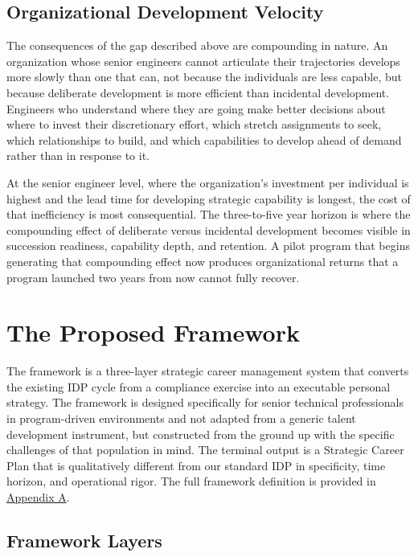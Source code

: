 \documentclass{article}
\begin{document}
\subsection{Organizational Development Velocity}

The consequences of the gap described above are compounding in nature.
An organization whose senior engineers cannot articulate their trajectories
develops more slowly than one that can, not because the individuals are less
capable, but because deliberate development is more efficient than incidental
development. Engineers who understand where they are going make better decisions
about where to invest their discretionary effort, which stretch assignments to
seek, which relationships to build, and which capabilities to develop ahead of
demand rather than in response to it.

At the senior engineer level, where the organization's investment per
individual is highest and the lead time for developing strategic capability is
longest, the cost of that inefficiency is most consequential. The
three-to-five year horizon is where the compounding effect of deliberate versus
incidental development becomes visible in succession readiness, capability
depth, and retention. A pilot program that begins generating that compounding
effect now produces organizational returns that a program launched two years
from now cannot fully recover.

\section{The Proposed Framework}

The framework is a three-layer strategic career management system that converts
the existing IDP cycle from a compliance exercise into an executable personal
strategy. The framework is designed specifically for senior technical professionals in
program-driven environments and not adapted from a generic talent development
instrument, but constructed from the ground up with the specific challenges of
that population in mind. The terminal output is a Strategic Career Plan that is
qualitatively different from our standard IDP in specificity, time horizon, and
operational rigor. The full framework definition is provided in 
\hyperref[AppendixA]{Appendix A}.

\subsection{Framework Layers}
\end{document}
